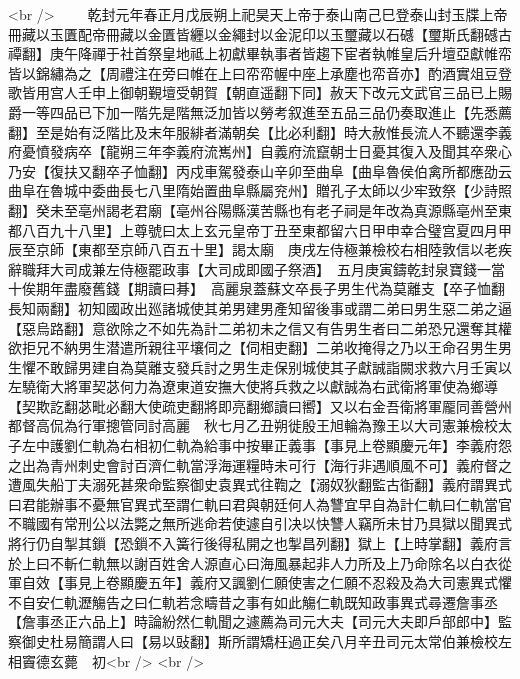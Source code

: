 <br />
　　乾封元年春正月戊辰朔上祀昊天上帝于泰山南己巳登泰山封玉牒上帝冊藏以玉匱配帝冊藏以金匱皆纒以金繩封以金泥印以玉璽藏以石䃭【璽斯氏翻䃭古禫翻】庚午降禪于社首祭皇地祗上初獻畢執事者皆趨下宦者執帷皇后升壇亞獻帷帟皆以錦繡為之【周禮注在旁曰帷在上曰帟帟幄中座上承塵也帟音亦】酌酒實俎豆登歌皆用宫人壬申上御朝覲壇受朝賀【朝直遥翻下同】赦天下改元文武官三品已上賜爵一等四品已下加一階先是階無泛加皆以勞考叙進至五品三品仍奏取進止【先悉薦翻】至是始有泛階比及末年服緋者滿朝矣【比必利翻】時大赦惟長流人不聽還李義府憂憤發病卒【龍朔三年李義府流嶲州】自義府流竄朝士日憂其復入及聞其卒衆心乃安【復扶又翻卒子恤翻】丙戍車駕發泰山辛卯至曲阜【曲阜魯侯伯禽所都應劭云曲阜在魯城中委曲長七八里隋始置曲阜縣屬兖州】贈孔子太師以少牢致祭【少詩照翻】癸未至亳州謁老君廟【亳州谷陽縣漢苦縣也有老子祠是年改為真源縣亳州至東都八百九十八里】上尊號曰太上玄元皇帝丁丑至東都留六日甲申幸合璧宫夏四月甲辰至京師【東都至京師八百五十里】謁太廟　庚戌左侍極兼檢校右相陸敦信以老疾辭職拜大司成兼左侍極罷政事【大司成即國子祭酒】　五月庚寅鑄乾封泉寶錢一當十俟期年盡廢舊錢【期讀曰朞】　高麗泉蓋蘇文卒長子男生代為莫離支【卒子恤翻長知兩翻】初知國政出廵諸城使其弟男建男產知留後事或謂二弟曰男生惡二弟之逼【惡烏路翻】意欲除之不如先為計二弟初未之信又有告男生者曰二弟恐兄還奪其權欲拒兄不納男生潜遣所親往平壤伺之【伺相吏翻】二弟收掩得之乃以王命召男生男生懼不敢歸男建自為莫離支發兵討之男生走保别城使其子獻誠詣闕求救六月壬寅以左驍衛大將軍契苾何力為遼東道安撫大使將兵救之以獻誠為右武衛將軍使為鄉導【契欺訖翻苾毗必翻大使疏吏翻將即亮翻鄉讀曰嚮】又以右金吾衛將軍龎同善營州都督高侃為行軍摠管同討高麗　秋七月乙丑朔徙殷王旭輪為豫王以大司憲兼檢校太子左中護劉仁軌為右相初仁軌為給事中按畢正義事【事見上卷顯慶元年】李義府怨之出為青州刺史會討百濟仁軌當浮海運糧時未可行【海行非遇順風不可】義府督之遭風失船丁夫溺死甚衆命監察御史袁異式往鞫之【溺奴狄翻監古衘翻】義府謂異式曰君能辦事不憂無官異式至謂仁軌曰君與朝廷何人為讐宜早自為計仁軌曰仁軌當官不職國有常刑公以法斃之無所逃命若使遽自引决以快讐人竊所未甘乃具獄以聞異式將行仍自掣其鎻【恐鎻不入簧行後得私開之也掣昌列翻】獄上【上時掌翻】義府言於上曰不斬仁軌無以謝百姓舍人源直心曰海風暴起非人力所及上乃命除名以白衣從軍自效【事見上卷顯慶五年】義府又諷劉仁願使害之仁願不忍殺及為大司憲異式懼不自安仁軌瀝觴告之曰仁軌若念疇昔之事有如此觴仁軌既知政事異式尋遷詹事丞【詹事丞正六品上】時論紛然仁軌聞之遽薦為司元大夫【司元大夫即戶部郎中】監察御史杜易簡謂人曰【易以䜴翻】斯所謂矯枉過正矣八月辛丑司元太常伯兼檢校左相竇德玄薨　初<br />
<br />

